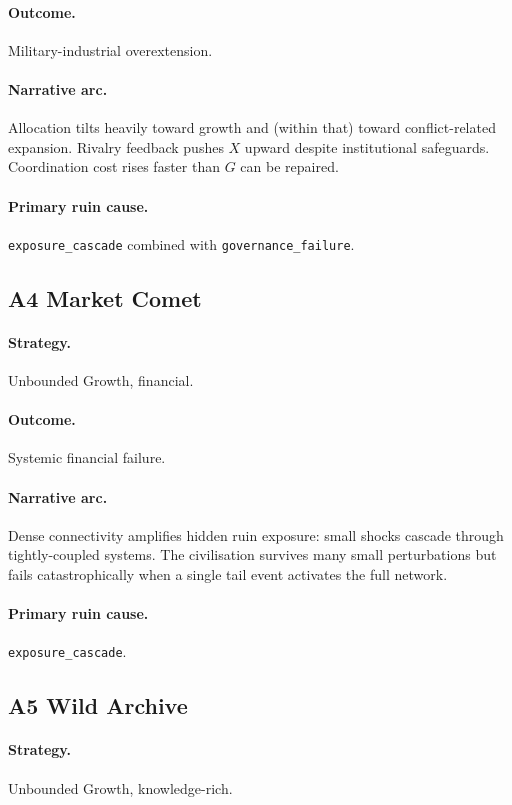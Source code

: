 \paragraph{Outcome.} Military-industrial overextension.
\paragraph{Narrative arc.}
Allocation tilts heavily toward growth and (within that)
toward conflict-related expansion. Rivalry feedback pushes $X$
upward despite institutional safeguards. Coordination cost rises
faster than $G$ can be repaired.
\paragraph{Primary ruin cause.} \texttt{exposure\_cascade}
combined with \texttt{governance\_failure}.

\subsection{A4 Market Comet}
\label{civ:a4}

\paragraph{Strategy.} Unbounded Growth, financial.
\paragraph{Outcome.} Systemic financial failure.
\paragraph{Narrative arc.}
Dense connectivity amplifies hidden ruin exposure: small
shocks cascade through tightly-coupled systems. The civilisation
survives many small perturbations but fails catastrophically when a
single tail event activates the full network.
\paragraph{Primary ruin cause.} \texttt{exposure\_cascade}.

\subsection{A5 Wild Archive}
\label{civ:a5}

\paragraph{Strategy.} Unbounded Growth, knowledge-rich.
